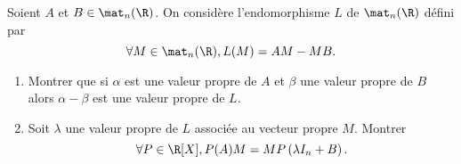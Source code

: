 \begin{enonce}
\begin{exercise}[ID={RMS127 E1015},subtitle={Centrale PSI 2016},tags={}]
  Soient $A$ et $B\in\mat_n(\R)$.
  On considère l'endomorphisme $L$ de $\mat_n(\R)$ défini par
  \begin{equation*}
    \forall M\in\mat_n(\R), L(M) = AM - MB.
  \end{equation*}

  \begin{enumerate}
    \item Montrer que si $\alpha$ est une valeur propre de $A$ et $\beta$ une valeur propre de $B$ alors $\alpha-\beta$ est une valeur propre de $L$.

    \item Soit $\lambda$ une valeur propre de $L$ associée au vecteur propre $M$.
      Montrer
      \begin{equation*}
        \forall P\in\R[X], P(A) M = M P\left( \lambda I_n + B \right).
      \end{equation*}
  \end{enumerate}
\end{exercise}
\begin{solution}
\end{solution}
\end{enonce}
